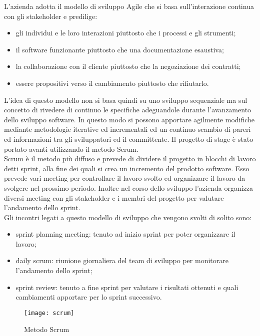 L'azienda adotta il modello di sviluppo Agile che si basa sull'interazione continua con gli stakeholder e predilige:
\begin{itemize}
	\item gli individui e le loro interazioni piuttosto che i processi e gli strumenti;
	\item il software funzionante piuttosto che una documentazione esaustiva;
	\item la collaborazione con il cliente piuttosto che la negoziazione dei contratti;
	\item essere propositivi verso il cambiamento piuttosto che rifiutarlo.
\end{itemize}
L'idea di questo modello non si basa quindi su uno sviluppo sequenziale ma sul concetto di rivedere di continuo le specifiche adeguandole durante l'avanzamento dello sviluppo software. In questo modo si possono apportare agilmente modifiche mediante metodologie iterative ed incrementali ed un continuo scambio di pareri ed informazioni tra gli sviluppatori ed il committente. Il progetto di stage è stato portato avanti utilizzando il metodo Scrum.\\
Scrum è il metodo più diffuso e prevede di dividere il progetto in blocchi di lavoro detti sprint, alla fine dei quali si crea un incremento del prodotto software. Esso prevede vari meeting per controllare il lavoro svolto ed organizzare il lavoro da svolgere nel prossimo periodo. Inoltre nel corso dello sviluppo l'azienda organizza diversi meeting con gli stakeholder e i membri del progetto per valutare l'andamento dello sprint.\\
Gli incontri legati a questo modello di sviluppo che vengono svolti di solito sono:
\begin{itemize}
	\item sprint planning meeting: tenuto ad inizio sprint per poter organizzare il lavoro;
	\item daily scrum: riunione giornaliera del team di sviluppo per monitorare l'andamento dello sprint;
	\item sprint review: tenuto a fine sprint per valutare i risultati ottenuti e quali cambiamenti apportare per lo sprint successivo.
\end{itemize}
\begin{figure}[h]
	\begin{center}
		\texttt{[image: scrum]}
		\caption{Metodo Scrum}
	\end{center}
\end{figure}
